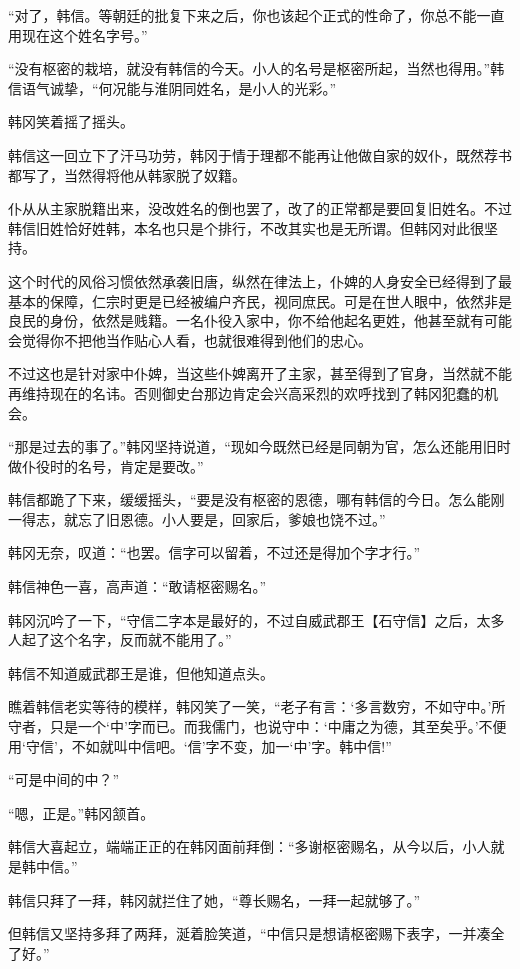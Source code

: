 “对了，韩信。等朝廷的批复下来之后，你也该起个正式的性命了，你总不能一直用现在这个姓名字号。”

“没有枢密的栽培，就没有韩信的今天。小人的名号是枢密所起，当然也得用。”韩信语气诚挚，“何况能与淮阴同姓名，是小人的光彩。”

韩冈笑着摇了摇头。

韩信这一回立下了汗马功劳，韩冈于情于理都不能再让他做自家的奴仆，既然荐书都写了，当然得将他从韩家脱了奴籍。

仆从从主家脱籍出来，没改姓名的倒也罢了，改了的正常都是要回复旧姓名。不过韩信旧姓恰好姓韩，本名也只是个排行，不改其实也是无所谓。但韩冈对此很坚持。

这个时代的风俗习惯依然承袭旧唐，纵然在律法上，仆婢的人身安全已经得到了最基本的保障，仁宗时更是已经被编户齐民，视同庶民。可是在世人眼中，依然非是良民的身份，依然是贱籍。一名仆役入家中，你不给他起名更姓，他甚至就有可能会觉得你不把他当作贴心人看，也就很难得到他们的忠心。

不过这也是针对家中仆婢，当这些仆婢离开了主家，甚至得到了官身，当然就不能再维持现在的名讳。否则御史台那边肯定会兴高采烈的欢呼找到了韩冈犯蠢的机会。

“那是过去的事了。”韩冈坚持说道，“现如今既然已经是同朝为官，怎么还能用旧时做仆役时的名号，肯定是要改。”

韩信都跪了下来，缓缓摇头，“要是没有枢密的恩德，哪有韩信的今日。怎么能刚一得志，就忘了旧恩德。小人要是，回家后，爹娘也饶不过。”

韩冈无奈，叹道：“也罢。信字可以留着，不过还是得加个字才行。”

韩信神色一喜，高声道：“敢请枢密赐名。”

韩冈沉吟了一下，“守信二字本是最好的，不过自威武郡王【石守信】之后，太多人起了这个名字，反而就不能用了。”

韩信不知道威武郡王是谁，但他知道点头。

瞧着韩信老实等待的模样，韩冈笑了一笑，“老子有言：‘多言数穷，不如守中。’所守者，只是一个‘中’字而已。而我儒门，也说守中：‘中庸之为德，其至矣乎。’不便用‘守信’，不如就叫中信吧。‘信’字不变，加一‘中’字。韩中信!”

“可是中间的中？”

“嗯，正是。”韩冈颔首。

韩信大喜起立，端端正正的在韩冈面前拜倒：“多谢枢密赐名，从今以后，小人就是韩中信。”

韩信只拜了一拜，韩冈就拦住了她，“尊长赐名，一拜一起就够了。”

但韩信又坚持多拜了两拜，涎着脸笑道，“中信只是想请枢密赐下表字，一并凑全了好。”

